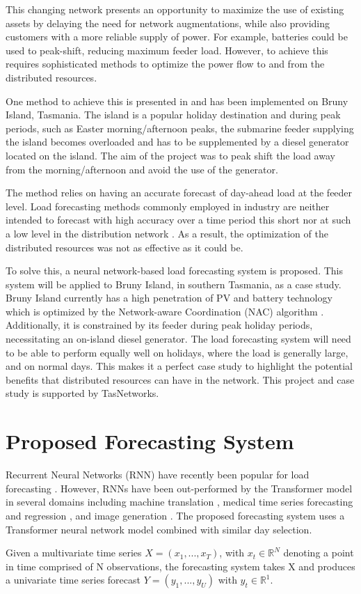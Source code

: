\documentclass[conference]{IEEEtran}
\begin{document}
This changing network presents an opportunity to maximize the use of existing assets by delaying the need for network augmentations, while also providing customers with a more reliable supply of power.
For example, batteries could be used to peak-shift, reducing maximum feeder load.
However, to achieve this requires sophisticated methods to optimize the power flow to and from the distributed resources.
\par
One method to achieve this is presented in \cite{Scott2014} and has been implemented on Bruny Island, Tasmania.
The island is a popular holiday destination and during peak periods, such as Easter morning/afternoon peaks, the submarine feeder supplying the island becomes overloaded and has to be supplemented by a diesel generator located on the island.
The aim of the project was to peak shift the load away from the morning/afternoon and avoid the use of the generator.

The method relies on having an accurate forecast of day-ahead load at the feeder level.
Load forecasting methods commonly employed in industry are neither intended to forecast with high accuracy over a time period this short nor at such a low level in the distribution network \cite{CIGRE2016}.
As a result, the optimization of the distributed resources was not as effective as it could be.
\par
To solve this, a neural network-based load forecasting system is proposed.
This system will be applied to Bruny Island, in southern Tasmania, as a case study.
Bruny Island currently has a high penetration of PV and battery technology which is optimized by the Network-aware Coordination (NAC) algorithm \cite{Evan2016}.
Additionally, it is constrained by its feeder during peak holiday periods, necessitating an on-island diesel generator. The load forecasting system will need to be able to perform equally well on holidays, where the load is generally large, and on normal days. 
This makes it a perfect case study to highlight the potential benefits that distributed resources can have in the network.
This project and case study is supported by TasNetworks.


\section{Proposed Forecasting System}
Recurrent Neural Networks (RNN) have recently been popular for load forecasting \cite{Kong2018}.
However, RNNs have been out-performed by the Transformer model in several domains including machine translation \cite{Vaswani2017}, medical time series forecasting and regression \cite{Song2017}, and image generation \cite{Parmar2018}.
The proposed forecasting system uses a Transformer neural network model combined with similar day selection.
\par
Given a multivariate time series $X = (x_1, ..., x_T)$, with $x_t \in \mathbb{R}^N$ denoting a point in time comprised of N observations, the forecasting system takes X and produces a univariate time series forecast $Y = (y_1, ..., y_U)$ with $y_t \in \mathbb{R}^1$.
\end{document}
